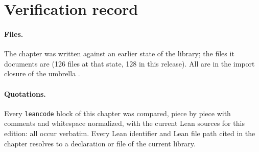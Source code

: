 \section{Verification record}\label{l29:sec:verification}

\paragraph{Files.} The chapter was written against an earlier state of the library; the files it documents are
 (126 files at that state, 128 in this release). All are in the import closure of the umbrella .

\paragraph{Quotations.} Every \texttt{leancode} block of this chapter was compared, piece by piece with comments and whitespace
normalized, with the current Lean sources for this edition: all occur verbatim. Every Lean identifier and Lean file
path cited in the chapter resolves to a declaration or file of the current library.

